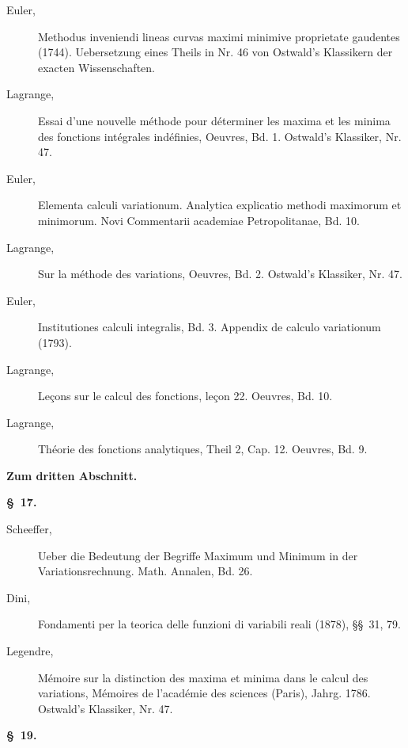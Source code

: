 \documentclass[11pt,a4paper,leqno]{article}
\begin{document}
\begin{description}
\item[Euler,] Methodus inveniendi lineas curvas maximi minimive proprietate
gaudentes (1744). Uebersetzung eines Theils in Nr. 46 von Ostwald's Klassikern
der exacten Wissenschaften.

\item[Lagrange,] Essai d'une nouvelle méthode pour déterminer les maxima et les
minima des fonctions intégrales indéfinies, Oeuvres, Bd. 1. Ostwald's
Klassiker, Nr. 47.

\item[Euler,] Elementa calculi variationum. Analytica explicatio methodi
maximorum et minimorum. Novi Commentarii academiae Petropolitanae, Bd. 10.

\item[Lagrange,] Sur la méthode des variations, Oeuvres, Bd. 2. Ostwald's
Klassiker, Nr. 47.

\item[Euler,] Institutiones calculi integralis, Bd. 3. Appendix de calculo
variationum (1793).

\item[Lagrange,] Leçons sur le calcul des fonctions, leçon 22. Oeuvres, Bd. 10.

\item[Lagrange,] Théorie des fonctions analytiques, Theil 2, Cap. 12. Oeuvres,
Bd. 9.
\end{description}

\begin{center}
{\large\bfseries Zum dritten Abschnitt.}

{\bfseries \S~17.}
\end{center}

\begin{description}
\item[Scheeffer,] Ueber die Bedeutung der Begriffe Maximum und Minimum in der
Variationsrechnung. Math. Annalen, Bd. 26.

\item[Dini,] Fondamenti per la teorica delle funzioni di variabili reali
(1878), \S\S~31, 79.

\item[Legendre,] Mémoire sur la distinction des maxima et minima dans le calcul
des variations, Mémoires de l'académie des sciences (Paris), Jahrg. 1786.
Ostwald's Klassiker, Nr. 47.
\end{description}

\begin{center}{\bfseries \S~19.}\end{center}
\end{document}
